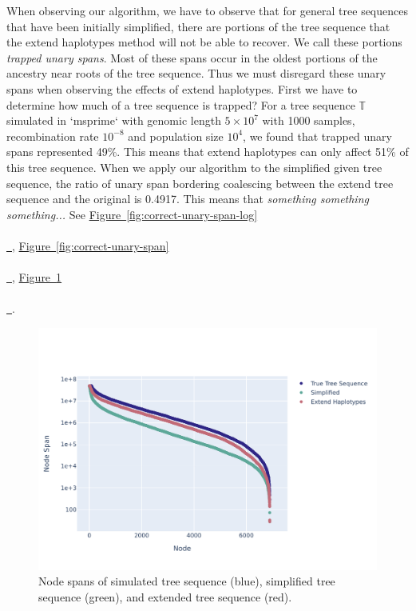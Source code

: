 \documentclass[10pt,twoside,lineno]{gsajnl}
\newcommand{\T}{\mathbb{T}}
\newcommand{\comment}[1]{{\color{violet} \it #1}}
\newcommand*{\figref}[2][]{%
	\hyperref[{#2}]{%
		Figure~\ref*{#2}%
		\ifx\\#1\\%
		\else
		\,#1%
		\fi
	}%
}
\begin{document}
When observing our algorithm, we have to observe that for general tree sequences that have been initially simplified, there are portions of the tree sequence that the extend haplotypes method will not be able to recover. We call these portions \textit{trapped unary spans}. Most of these spans occur in the oldest portions of the ancestry near roots of the tree sequence. Thus we must disregard these unary spans when observing the effects of extend haplotypes.
First we have to determine how much of a tree sequence is trapped?
For a tree sequence $\T$ simulated in `msprime` with genomic length $5\times 10^7$ with 1000 samples, recombination rate $10^{-8}$ and population size $10^4$, we found that trapped unary spans represented 49\%.
This means that extend haplotypes can only affect 51\% of this tree sequence.
When we apply our algorithm to the simplified given tree sequence, the ratio of unary span bordering coalescing between the extend tree sequence and the original is 0.4917. This means that \comment{something something something...}  
See \figref{fig:correct-unary-span-log}, \figref{fig:correct-unary-span}, \figref{fig:node-spans}.


%
%

\begin{figure}[bht]
	\includegraphics[width=0.9\linewidth]{newplots_wo_ee/node_spans_wo_trapped_unary_regions.pdf}
	\caption{Node spans of simulated tree sequence (blue), simplified tree sequence (green), and extended tree sequence (red).}
	\label{fig:node-spans}
\end{figure}
\end{document}

